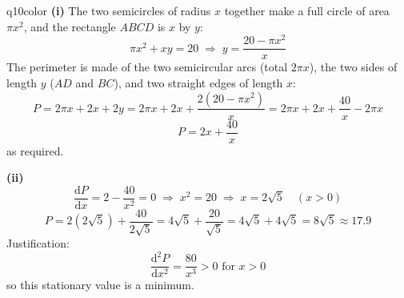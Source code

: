 \documentclass[11pt,a4paper]{article}
\begin{document}
\begin{ansbox}{q10color}
\textbf{(i)} The two semicircles of radius $x$ together make a full circle of area $\pi x^2$, and the rectangle $ABCD$ is $x$ by $y$:
\[ \pi x^2+xy=20 \;\Rightarrow\; y=\frac{20-\pi x^2}{x} \]
The perimeter is made of the two semicircular arcs (total $2\pi x$), the two sides of length $y$ ($AD$ and $BC$), and two straight edges of length $x$:
\[ P=2\pi x+2x+2y=2\pi x+2x+\frac{2\left(20-\pi x^2\right)}{x}=2\pi x+2x+\frac{40}{x}-2\pi x \]
\[ P=2x+\frac{40}{x} \]
as required.

\textbf{(ii)}
\[ \frac{\mathrm{d}P}{\mathrm{d}x}=2-\frac{40}{x^2}=0 \;\Rightarrow\; x^2=20 \;\Rightarrow\; x=2\sqrt{5}\quad(x>0) \]
\[ P=2\left(2\sqrt{5}\right)+\frac{40}{2\sqrt{5}}=4\sqrt{5}+\frac{20}{\sqrt{5}}=4\sqrt{5}+4\sqrt{5}=\boxed{8\sqrt{5}\approx 17.9} \]
Justification:
\[ \frac{\mathrm{d}^2P}{\mathrm{d}x^2}=\frac{80}{x^3}>0 \text{ for } x>0 \]
so this stationary value is a minimum.
\end{ansbox}
\end{document}
